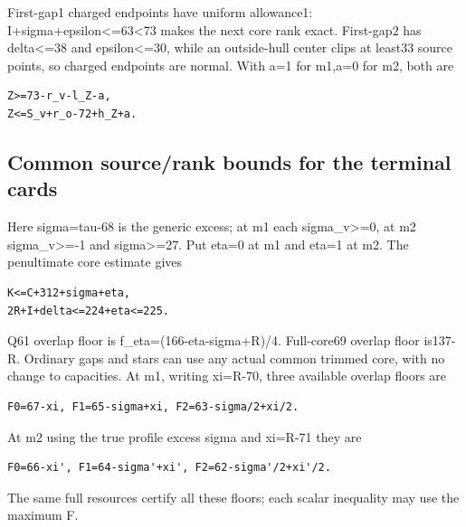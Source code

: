 \documentclass[10pt,a4paper]{article}
\theoremstyle{definition}
\begin{document}
First-gap1 charged endpoints have uniform allowance1:
I+\allowbreak{}sigma+\allowbreak{}epsilon\textless=\allowbreak{}63\textless73 makes the next core rank exact.
First-gap2 has delta\textless=\allowbreak{}38 and epsilon\textless=\allowbreak{}30,\allowbreak{} while an
outside-hull center clips at least33 source points,\allowbreak{} so charged endpoints
are normal. With a=\allowbreak{}1 for m1,\allowbreak{}a=\allowbreak{}0 for m2,\allowbreak{} both are

\begin{lstlisting}
Z>=73-r_v-l_Z-a,
Z<=S_v+r_o-72+h_Z+a.
\end{lstlisting}

\hypertarget{common-sourcerank-bounds-for-the-terminal-cards}{%
\subsection{Common source/rank bounds for the terminal
cards}\label{common-sourcerank-bounds-for-the-terminal-cards}}

Here sigma=\allowbreak{}tau-68 is the generic excess; at m1 each
sigma\_\allowbreak{}v\textgreater=\allowbreak{}0,\allowbreak{} at m2 sigma\_\allowbreak{}v\textgreater=\allowbreak{}-1 and
sigma\textgreater=\allowbreak{}27. Put eta=\allowbreak{}0 at m1 and eta=\allowbreak{}1 at m2. The penultimate
core estimate gives

\begin{lstlisting}
K<=C+312+sigma+eta,
2R+I+delta<=224+eta<=225.
\end{lstlisting}

Q61 overlap floor is f\_\allowbreak{}eta=\allowbreak{}(166-eta-sigma+\allowbreak{}R)/4. Full-core69 overlap
floor is137-R. Ordinary gaps and stars can use any actual common trimmed
core,\allowbreak{} with no change to capacities. At m1,\allowbreak{} writing xi=\allowbreak{}R-70,\allowbreak{} three
available overlap floors are

\begin{lstlisting}
F0=67-xi, F1=65-sigma+xi, F2=63-sigma/2+xi/2.
\end{lstlisting}

At m2 using the true profile excess sigma\textquotesingle{} and
xi\textquotesingle=\allowbreak{}R-71 they are

\begin{lstlisting}
F0=66-xi', F1=64-sigma'+xi', F2=62-sigma'/2+xi'/2.
\end{lstlisting}

The same full resources certify all these floors; each scalar inequality
may use the maximum F.
\end{document}
